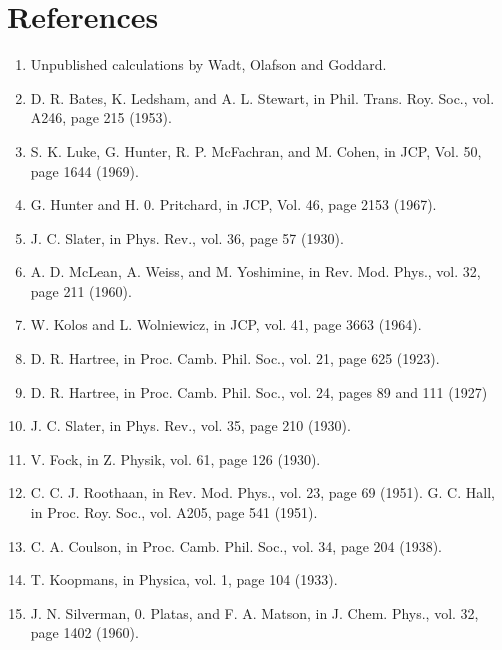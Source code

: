 \section{References}

\begin{enumerate}
\item Unpublished calculations by Wadt, Olafson and Goddard.

\item D. R. Bates, K. Ledsham, and A. L. Stewart, in Phil. Trans. Roy. Soc., 
vol. A246, page 215 (1953).

\item S. K. Luke, G. Hunter, R. P. McFachran, and M. Cohen, in JCP, Vol. 50, 
page 1644 (1969).

\item G. Hunter and H. 0. Pritchard, in JCP, Vol. 46, page 2153 (1967).

\item J. C. Slater, in Phys. Rev., vol. 36, page 57 (1930).

\item A. D. McLean, A. Weiss, and M. Yoshimine, in Rev. Mod. Phys., vol. 32, 
page 211 (1960).

\item W. Kolos and L. Wolniewicz, in JCP, vol. 41, page 3663 (1964).

\item D. R. Hartree, in Proc. Camb. Phil. Soc., vol. 21, page 625 (1923).

\item D. R. Hartree, in Proc. Camb. Phil. Soc., vol. 24, pages 89 and 111 
(1927)

\item  J. C. Slater, in Phys. Rev., vol. 35, page 210 (1930).

\item  V. Fock, in Z. Physik, vol. 61, page 126 (1930).

\item  C. C. J. Roothaan, in Rev. Mod. Phys., vol. 23, page 69 (1951). G. C. 
Hall, in Proc. Roy. Soc., vol. A205, page 541 (1951).

\item C. A. Coulson, in Proc. Camb. Phil. Soc., vol. 34, page 204 (1938).

\item T. Koopmans, in Physica, vol. 1, page 104 (1933).

\item J. N. Silverman, 0. Platas, and F. A. Matson, in J. Chem. Phys., vol. 
32, page 1402 (1960).


\end{enumerate}
